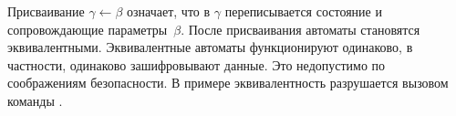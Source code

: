 Присваивание $\gamma\leftarrow\beta$ означает, что в $\gamma$ переписывается 
состояние и сопровождающие параметры~$\beta$. 
%
После присваивания автоматы становятся эквивалентными. Эквивалентные автоматы 
функционируют одинаково, в частности, одинаково зашифровывают данные. 
Это недопустимо по соображениям безопасности.
%
В примере эквивалентность разрушается вызовом команды .


